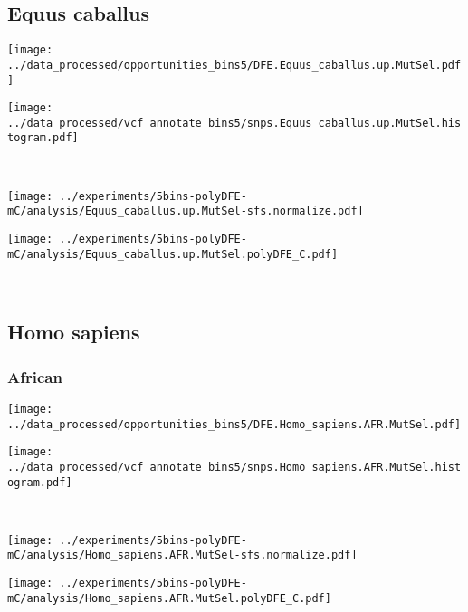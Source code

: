 \subsection{Equus caballus}

\begin{minipage}{0.49\linewidth}
    \texttt{[image: ../data\_processed/opportunities\_bins5/DFE.Equus\_caballus.up.MutSel.pdf]}
\end{minipage}
\begin{minipage}{0.49\linewidth}
    \texttt{[image: ../data\_processed/vcf\_annotate\_bins5/snps.Equus\_caballus.up.MutSel.histogram.pdf]}
\end{minipage}
\\
\begin{minipage}{0.49\linewidth}
    \texttt{[image: ../experiments/5bins-polyDFE-mC/analysis/Equus\_caballus.up.MutSel-sfs.normalize.pdf]}
\end{minipage}
\begin{minipage}{0.49\linewidth}
    \texttt{[image: ../experiments/5bins-polyDFE-mC/analysis/Equus\_caballus.up.MutSel.polyDFE\_C.pdf]}
\end{minipage}
\\

\subsection{Homo sapiens}

\subsubsection{African}

\begin{minipage}{0.49\linewidth}
    \texttt{[image: ../data\_processed/opportunities\_bins5/DFE.Homo\_sapiens.AFR.MutSel.pdf]}
\end{minipage}
\begin{minipage}{0.49\linewidth}
    \texttt{[image: ../data\_processed/vcf\_annotate\_bins5/snps.Homo\_sapiens.AFR.MutSel.histogram.pdf]}
\end{minipage}
\\
\begin{minipage}{0.49\linewidth}
    \texttt{[image: ../experiments/5bins-polyDFE-mC/analysis/Homo\_sapiens.AFR.MutSel-sfs.normalize.pdf]}
\end{minipage}
\begin{minipage}{0.49\linewidth}
    \texttt{[image: ../experiments/5bins-polyDFE-mC/analysis/Homo\_sapiens.AFR.MutSel.polyDFE\_C.pdf]}
\end{minipage}
\\

